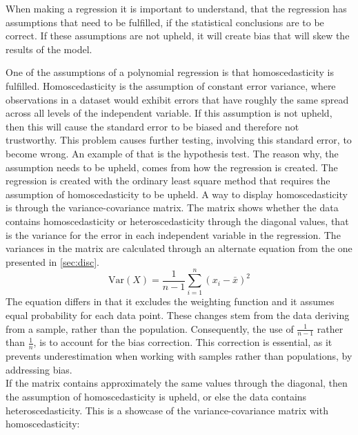 When making a regression it is important to understand, that the regression has assumptions that need to be fulfilled, if the statistical conclusions are to be correct. If these assumptions are not upheld, it will create bias that will skew the results of the model. \newline 

One of the assumptions of a polynomial regression is that homoscedasticity is fulfilled. Homoscedasticity is the assumption of constant error variance, where observations in a dataset would exhibit errors that have roughly the same spread across all levels of the independent variable.
\newline
If this assumption is not upheld, then this will cause the standard error to be biased and therefore not trustworthy. This problem causes further testing, involving this standard error, to become wrong. An example of that is the hypothesis test.
\newline
The reason why, the assumption needs to be upheld, comes from how the regression is created. The regression is created with the ordinary least square method that requires the assumption of homoscedasticity to be upheld.
\newline
A way to display homoscedasticity is through the variance-covariance matrix. The matrix shows whether the data contains homoscedasticity or heteroscedasticity through the diagonal values, that is the variance for the error in each independent variable in the regression. The variances in the matrix are calculated through an alternate equation from the one presented in \autoref{sec:disc}.
\begin{equation}
	\text{Var}(X) = \frac{1}{n - 1} \sum_{i=1}^{n} (x_i - \bar{x})^2
\end{equation}
The equation differs in that it excludes the weighting function and it assumes equal probability for each data point. These changes stem from the data deriving from a sample, rather than the population. Consequently, the use of $\frac{1}{n-1}$ rather than $\frac{1}{n}$, is to account for the bias correction. This correction is essential, as it prevents underestimation when working with samples rather than populations, by addressing bias.\\
If the matrix contains approximately the same values through the diagonal, then the assumption of homoscedasticity is upheld, or else the data contains heteroscedasticity. This is a showcase of the variance-covariance matrix with homoscedasticity:


